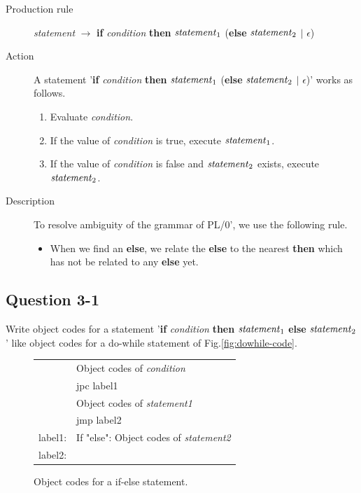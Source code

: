 \documentclass{article}
\begin{document}
\begin{description}
 \item[Production rule] {\it statement}  $\to$ {\bf if} {\it condition} {\bf then} 
       ${\it statement}_1$ ({\bf else} ${\it statement}_2$ $\vert$ {$\epsilon$})
 \item[Action] A statement '{\bf if} {\it condition} {\bf then} 
	    ${\it statement}_1$ ({\bf else} ${\it statement}_2$ $\vert$ {$\epsilon$})'
	    works as follows.
	    \begin{enumerate}
	     \item Evaluate {\it condition}.
	     \item If the value of {\it condition} is true, execute ${\it statement}_1$.
	     \item If the value of {\it condition} is false and ${\it statement}_2$ exists, 
		   execute ${\it statement}_2$.
	    \end{enumerate}
 \item[Description] To resolve ambiguity of the grammar of PL/0', 
	    we use the following rule.
	    \begin{itemize}
	     \item When we find an {\bf else}, we relate the {\bf else} to the nearest {\bf then}
		   which has not be related to any {\bf else} yet.
	    \end{itemize}
\end{description}


\subsection*{Question 3-1}
Write object codes for 
a statement '{\bf if} {\it condition} {\bf then}
${\it statement}_1$ {\bf else} ${\it statement}_2$'
like object codes for a do-while statement of Fig.\ref{fig:dowhile-code}.


\ifreport
\begin{figure}[h]
\begin{tabular}{ll}
        & Object codes of {\it condition} \\
        & jpc label1 \\
        & Object codes of {\it statement1} \\
        & jmp label2 \\
label1: & If "else": Object codes of {\it statement2} \\
label2: & \\
\end{tabular}
\caption{Object codes for a if-else statement.}
\label{fig:q31}
\end{figure}
\fi
\end{document}
